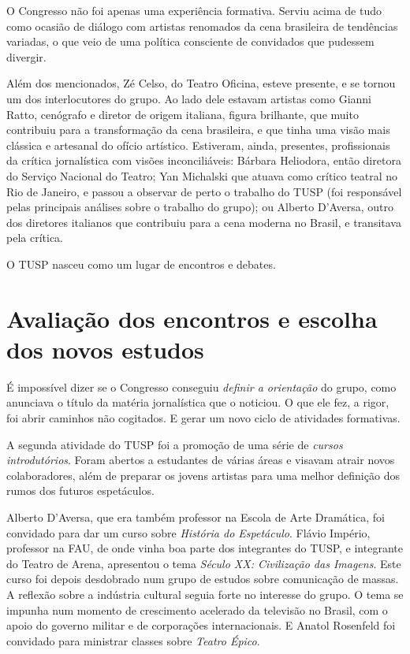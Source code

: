 O Congresso não foi apenas uma experiência formativa. Serviu acima de
tudo como ocasião de diálogo com artistas renomados da cena brasileira
de tendências variadas, o que veio de uma política consciente de
convidados que pudessem divergir.

Além dos mencionados, Zé Celso, do Teatro Oficina, esteve presente, e se
tornou um dos interlocutores do grupo. Ao lado dele estavam artistas
como Gianni Ratto, cenógrafo e diretor de origem italiana, figura
brilhante, que muito contribuiu para a transformação da cena brasileira,
e que tinha uma visão mais clássica e artesanal do ofício artístico.
Estiveram, ainda, presentes, profissionais da crítica jornalística com
visões inconciliáveis: Bárbara Heliodora, então diretora do Serviço
Nacional do Teatro; Yan Michalski que atuava como crítico teatral no Rio
de Janeiro, e passou a observar de perto o trabalho do TUSP (foi
responsável pelas principais análises sobre o trabalho do grupo); ou
Alberto D'Aversa, outro dos diretores italianos que contribuiu para a
cena moderna no Brasil, e transitava pela crítica.

O TUSP nasceu como um lugar de encontros e debates.

\section{Avaliação dos encontros e escolha dos novos estudos}

É impossível dizer se o Congresso conseguiu \textit{definir a orientação}
do grupo, como anunciava o título da matéria jornalística que o
noticiou. O que ele fez, a rigor, foi abrir caminhos não cogitados. E
gerar um novo ciclo de atividades formativas.

A segunda atividade do TUSP foi a promoção de uma série de \textit{cursos
introdutórios}. Foram abertos a estudantes de várias áreas e visavam
atrair novos colaboradores, além de preparar os jovens artistas para uma
melhor definição dos rumos dos futuros espetáculos.

Alberto D'Aversa, que era também professor na Escola de Arte Dramática,
foi convidado para dar um curso sobre \textit{História do Espetáculo}.
Flávio Império, professor na FAU, de onde vinha boa parte dos
integrantes do TUSP, e integrante do Teatro de Arena, apresentou o tema
\textit{Século XX: Civilização das Imagens}. Este curso foi depois
desdobrado num grupo de estudos sobre comunicação de massas. A reflexão
sobre a indústria cultural seguia forte no interesse do grupo. O tema se
impunha num momento de crescimento acelerado da televisão no Brasil, com
o apoio do governo militar e de corporações internacionais. E Anatol
Rosenfeld foi convidado para ministrar classes sobre \textit{Teatro Épico}.

